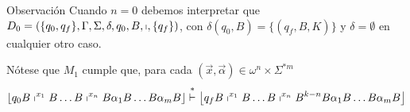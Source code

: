 \begin{frame}
  \begin{alertblock}{Observación}
    \PN Cuando $n=0$ debemos interpretar que $D_{0} = \left(\{q_{0},q_{f}\}, \Gamma, \Sigma, \delta, q_{0}, B,
    \shortmid, \{q_{f}\}\right)$, con $\delta(q_{0},B) = \{(q_{f},B,K)\}$ y $\delta = \emptyset$ en cualquier otro caso.
  \end{alertblock}

  \vspace{3mm}
  \begin{block}{}
    \PN Nótese que $M_{1}$ cumple que, para cada $(\vec{x},\vec{\alpha}) \in \omega^{n} \times \Sigma^{\ast m}$
    \sizeOfLetterSecond
    \begin{equation*}
      \left\lfloor q_{0} B \shortmid^{x_{1}} B \dotsc B \shortmid^{x_{n}} B \alpha_{1} B \dotsc B \alpha_{m} B
      \right\rfloor \overset{\ast}{\vdash} \left\lfloor q_{f} B \shortmid^{x_{1}} B \dotsc B \shortmid^{x_{n}} B^{k-n}B
      \alpha_{1} B \dotsc B \alpha_{m} B \right\rfloor
    \end{equation*}
  \end{block}
\end{frame}
